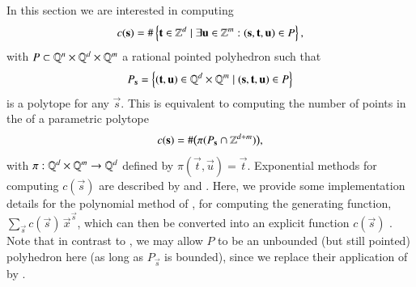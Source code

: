 In this section we are interested in computing
\begin{equation}
\label{eq:count:projection}
c(\vec s)=\#\left\{\vec t\in\ZZ^{d} \mid \exists \vec u\in\ZZ^{m}:
(\vec s,\vec t,\vec u)\in P\right\}
,
\end{equation}
with $P \subset \mathbb{Q}^{n}\times\mathbb{Q}^{d}\times\mathbb{Q}^{m}$ a rational
pointed polyhedron such that
$$
P_{\vec s}=\left\{(\vec t,\vec u)\in\QQ^d\times\QQ^m
\mid (\vec s,\vec t,\vec u)\in P\right\}
$$
is a polytope for any $\vec s$.
This is equivalent to computing the number of points
in the  of a parametric polytope
$$
c(\vec s)=\#\big(\pi(P_{\vec s}\cap\ZZ^{d+m})\big)
,
$$
with $\pi:\mathbb{Q}^d\times\mathbb{Q}^m\rightarrow\mathbb{Q}^d$ defined by
$\pi(\vec t, \vec u)=\vec t$.
Exponential methods for computing $c(\vec s)$ are
described by 
and .
Here, we provide some implementation details for the polynomial
method of , for
computing the generating function, $\sum_{\vec s}c(\vec s) \, \vec x^{\vec s}$,
which can then be converted into an explicit function $c(\vec s)$
.
Note that in contrast to ,
we may allow $P$ to be an unbounded (but still pointed) polyhedron here
(as long as $P_{\vec s}$ is bounded), since
we replace their application of
by .

